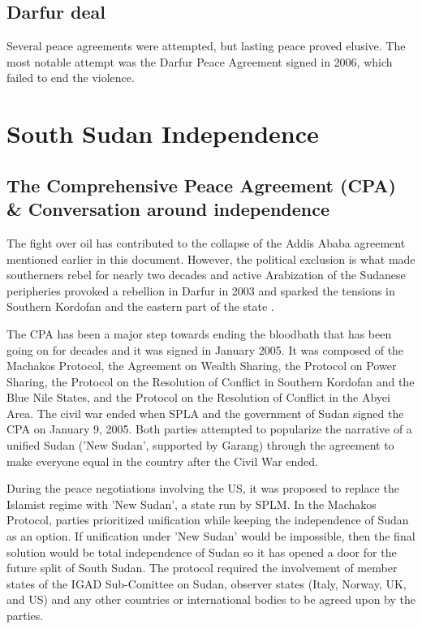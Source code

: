 \documentclass[14pt,a4paper]{article}
\begin{document}
\subsection{Darfur deal}
Several peace agreements were attempted, but lasting peace proved elusive. The most notable attempt was the Darfur Peace Agreement signed in 2006, which failed to end the violence.

\section{South Sudan Independence}
\subsection{The Comprehensive Peace Agreement (CPA) \& Conversation around independence}
The fight over oil has contributed to the collapse of the Addis Ababa agreement mentioned earlier in this document. However, the political exclusion is what made southerners rebel for nearly two decades and active Arabization of the Sudanese peripheries provoked a rebellion in Darfur in 2003 and sparked the tensions in Southern Kordofan and the eastern part of the state \cite{challenges}. 

The CPA has been a major step towards ending the bloodbath that has been going on for decades and it was signed in January 2005. It was composed of the Machakos Protocol, the Agreement on Wealth Sharing, the Protocol on Power Sharing, the Protocol on the Resolution of Conﬂict in Southern Kordofan and the Blue Nile States, and the Protocol on the Resolution of Conﬂict in the Abyei Area. The civil war ended when SPLA and the government of Sudan signed the CPA on January 9, 2005. Both parties attempted to popularize the narrative of a unified Sudan ('New Sudan', supported by Garang) through the agreement to make everyone equal in the country after the Civil War ended. 

During the peace negotiations involving the US, it was proposed to replace the Islamist regime with 'New Sudan', a state run by SPLM. In the Machakos Protocol, parties prioritized unification while keeping the independence of Sudan as an option. If unification under 'New Sudan' would be impossible, then the final solution would be total independence of Sudan so it has opened a door for the future split of South Sudan. The protocol required the involvement of member states of the IGAD Sub-Comittee on Sudan, observer states (Italy, Norway, UK, and US) and any other countries or international bodies to be agreed upon by the parties.
\end{document}
